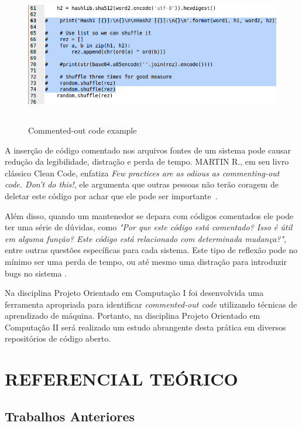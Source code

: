 \documentclass{abnt}
\begin{document}
\begin{figure}[h!]
  \centering
  \includegraphics[height=2.4in,width=6.3in]{../images/gcc06.png}
  \caption{Commented-out code example }
  \label{fig:commentExample}
\end{figure}


A inserção de código comentado nos arquivos fontes de um sistema pode causar
redução da legibilidade, distração e perda de tempo. MARTIN R., em seu livro clássico
Clean Code, enfatiza \textit{Few practices are as odious as commenting-out code. 
Don’t do this!}, ele argumenta que outras pessoas não terão coragem de deletar 
este código por achar que ele pode ser importante~\cite{cleanCode}. 

Além disso, quando um mantenedor se depara com códigos comentados ele pode ter uma 
série de dúvidas, como \textit{"Por que este código está comentado? Isso é útil em 
alguma função? Este código está relacionado com determinada mudança?"}, entre outras 
questões específicas para cada sistema. Este tipo de reflexão pode no mínimo ser 
uma perda de tempo, ou até mesmo uma distração para introduzir bugs no sistema \cite{cleanCode}.

Na disciplina Projeto Orientado em Computação I foi desenvolvida uma ferramenta
apropriada para identificar \textit{commented-out code} utilizando técnicas de aprendizado de máquina.
Portanto, na disciplina Projeto Orientado em Computação II será realizado um estudo abrangente desta 
prática em diversos repositórios de código aberto.


\chapter{REFERENCIAL TEÓRICO}


\section{Trabalhos Anteriores}
\end{document}
